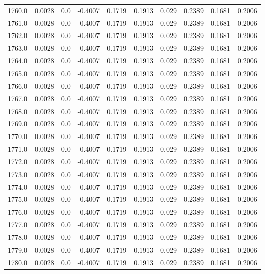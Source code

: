 \begin{longtable}{lrrrrrrrrr}
1760.0 & 0.0028 & 0.0 & -0.4007 & 0.1719 & 0.1913 & 0.029 & 0.2389 & 0.1681 & 0.2006 \\
1761.0 & 0.0028 & 0.0 & -0.4007 & 0.1719 & 0.1913 & 0.029 & 0.2389 & 0.1681 & 0.2006 \\
1762.0 & 0.0028 & 0.0 & -0.4007 & 0.1719 & 0.1913 & 0.029 & 0.2389 & 0.1681 & 0.2006 \\
1763.0 & 0.0028 & 0.0 & -0.4007 & 0.1719 & 0.1913 & 0.029 & 0.2389 & 0.1681 & 0.2006 \\
1764.0 & 0.0028 & 0.0 & -0.4007 & 0.1719 & 0.1913 & 0.029 & 0.2389 & 0.1681 & 0.2006 \\
1765.0 & 0.0028 & 0.0 & -0.4007 & 0.1719 & 0.1913 & 0.029 & 0.2389 & 0.1681 & 0.2006 \\
1766.0 & 0.0028 & 0.0 & -0.4007 & 0.1719 & 0.1913 & 0.029 & 0.2389 & 0.1681 & 0.2006 \\
1767.0 & 0.0028 & 0.0 & -0.4007 & 0.1719 & 0.1913 & 0.029 & 0.2389 & 0.1681 & 0.2006 \\
1768.0 & 0.0028 & 0.0 & -0.4007 & 0.1719 & 0.1913 & 0.029 & 0.2389 & 0.1681 & 0.2006 \\
1769.0 & 0.0028 & 0.0 & -0.4007 & 0.1719 & 0.1913 & 0.029 & 0.2389 & 0.1681 & 0.2006 \\
1770.0 & 0.0028 & 0.0 & -0.4007 & 0.1719 & 0.1913 & 0.029 & 0.2389 & 0.1681 & 0.2006 \\
1771.0 & 0.0028 & 0.0 & -0.4007 & 0.1719 & 0.1913 & 0.029 & 0.2389 & 0.1681 & 0.2006 \\
1772.0 & 0.0028 & 0.0 & -0.4007 & 0.1719 & 0.1913 & 0.029 & 0.2389 & 0.1681 & 0.2006 \\
1773.0 & 0.0028 & 0.0 & -0.4007 & 0.1719 & 0.1913 & 0.029 & 0.2389 & 0.1681 & 0.2006 \\
1774.0 & 0.0028 & 0.0 & -0.4007 & 0.1719 & 0.1913 & 0.029 & 0.2389 & 0.1681 & 0.2006 \\
1775.0 & 0.0028 & 0.0 & -0.4007 & 0.1719 & 0.1913 & 0.029 & 0.2389 & 0.1681 & 0.2006 \\
1776.0 & 0.0028 & 0.0 & -0.4007 & 0.1719 & 0.1913 & 0.029 & 0.2389 & 0.1681 & 0.2006 \\
1777.0 & 0.0028 & 0.0 & -0.4007 & 0.1719 & 0.1913 & 0.029 & 0.2389 & 0.1681 & 0.2006 \\
1778.0 & 0.0028 & 0.0 & -0.4007 & 0.1719 & 0.1913 & 0.029 & 0.2389 & 0.1681 & 0.2006 \\
1779.0 & 0.0028 & 0.0 & -0.4007 & 0.1719 & 0.1913 & 0.029 & 0.2389 & 0.1681 & 0.2006 \\
1780.0 & 0.0028 & 0.0 & -0.4007 & 0.1719 & 0.1913 & 0.029 & 0.2389 & 0.1681 & 0.2006 \\

\end{longtable}
